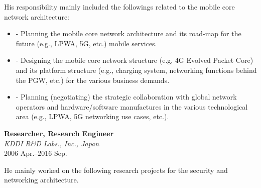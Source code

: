 \hspace*{4ex} His responsibility mainly included the followings related to the mobile core network architecture:
\begin{itemize}
 \item \hspace*{4ex}\begin{minipage}{0.9\linewidth}
- Planning the mobile core network architecture and its road-map for the future (e.g., LPWA, 5G, etc.) mobile services.\end{minipage}
 \item \hspace*{4ex}\begin{minipage}{0.9\linewidth}
- Designing the mobile core network structure (e.g, 4G Evolved Packet Core) and its platform structure (e.g., charging system, networking functions behind the PGW, etc.) for the various business demands.
\end{minipage}
 \item \hspace*{4ex}\begin{minipage}{0.9\linewidth}
- Planning (negotiating) the strategic collaboration with global network operators and hardware/software manufactures in the various technological area (e.g., LPWA, 5G networking use cases, etc.).
\end{minipage}
\end{itemize}
\vspace*{2ex}


\textbf{Researcher, Research Engineer}\\
\hspace*{4ex}\textit{KDDI R\&D Labs.\@, Inc., Japan}\\
\hspace*{4ex}2006 Apr.--2016 Sep.

\hspace*{4ex} He mainly worked on the following research projects for the security and networking architecture.


